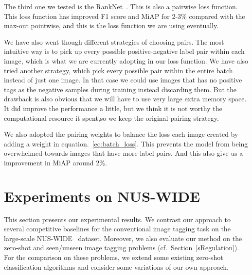 \documentclass[10pt,twocolumn,letterpaper]{article}
\newcommand{\eat}[1]{{}}
\begin{document}
{The third one we tested is the RankNet~\cite{burges_learning_2005}. This is also a pairwise loss function. This loss function has improved F1 score and MiAP for 2-3\% compared with the max-out pointwise, and this is the loss function we are using eventually.

We have also went though different strategies of choosing pairs. The most intuitive way is to pick up every possible positive-negative label pair within each image, which is what we are currently adopting in our loss function. We have also tried another strategy, which pick every possible pair within the entire batch instead of just one image. In that case we could use images that has no positive tags as the negative samples during training instead discarding them. But the drawback is also obvious that we will have to use very large extra memory space. It did improve the performance a little, but we think it is not worthy the computational resource it spent,so we keep the original pairing strategy.

We also adopted the pairing weights to balance the loss each image created by adding a  weight in equation.~\ref{eq:batch_loss}. This prevents the model from being overwhelmed towards images that have more label pairs. And this also give us a improvement in MiAP around 2\%.
		
}	 \section{Experiments on NUS-WIDE}
\label{sExp}

This section presents our experimental results. We contrast our approach to several competitive baselines for the conventional image tagging task on the large-scale NUS-WIDE~\cite{chua_nus-wide:_2009} dataset. Moreover, we also evaluate our method on the zero-shot and seen/unseen image tagging problems  (cf.\ Section~\ref{sRegulation}). For the comparison on these problems, we extend some existing zero-shot classification algorithms and consider some variations of our own approach. 

\eat{
There are three major sections of experiments:
1. The traditional tagging problem. We compared our method with conventional tagging methods such as TagProp~\cite{guillaumin_tagprop:_2009} and FastTag~\cite{chen_fast_2013} on the convention tagging task.

2. The zero-shot tagging problem. We compared our method with zero-shot learning methods such as state-of-art Akata \etal~\cite{akata_evaluation_2015} and some of our own proposed baselines on the zero-shot tagging task. In the zero-shot tagging task, the tags in training and testing set are disjoint.

3. The mix tagging problem. In this scenario we trained our method and baselines on the seen tags and tested them on the combination of both seen and unsee tags.
}
\end{document}
